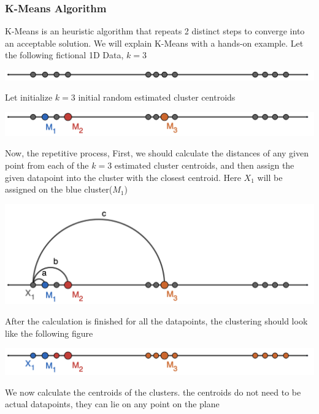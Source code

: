 \documentclass[11pt]{article}
\begin{document}
			\subsubsection*{K-Means Algorithm}
				K-Means is an heuristic algorithm that repeats 2 distinct steps to converge into an acceptable solution. We will explain K-Means with a hands-on example.
				Let the following fictional 1D Data, $k=3$
				\iftrue
				\begin{center}
					\includegraphics[scale=0.5]{res/t1/t12/t12-kmeans-1}
				\end{center}
				\fi
				Let initialize $k=3$ initial random estimated cluster centroids
				\iftrue
				\begin{center}
					\includegraphics[scale=0.5]{res/t1/t12/t12-kmeans-2}
				\end{center}
				\fi
				Now, the repetitive process, First, we should calculate the distances of any given point from each of the $k=3$ 
				estimated cluster centroids, and then assign the given datapoint into the cluster with the closest centroid. Here $X_1$ will be 
				assigned on the blue cluster($M_1$)
				\iftrue
				\begin{center}
					\includegraphics[scale=0.5]{res/t1/t12/t12-kmeans-3}
				\end{center}
				\fi
				After the calculation is finished for all the datapoints, the clustering should look like the following figure
				\iftrue
				\begin{center}
					\includegraphics[scale=0.5]{res/t1/t12/t12-kmeans-4}
				\end{center}
				\fi
				We now calculate the centroids of the clusters. the centroids do not need to be actual datapoints, they can lie on any point on the plane
\end{document}
